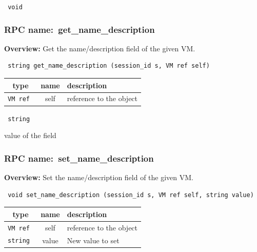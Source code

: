 \vspace{0.3cm}

{\tt 
void
}



\vspace{0.3cm}
\vspace{0.3cm}
\vspace{0.3cm}
\subsubsection{RPC name:~get\_name\_description}

{\bf Overview:} 
Get the name/description field of the given VM.

\begin{verbatim} string get_name_description (session_id s, VM ref self)\end{verbatim}



 
\vspace{0.3cm}
\begin{tabular}{|c|c|p{7cm}|}
 \hline
{\bf type} & {\bf name} & {\bf description} \\ \hline
{\tt VM ref } & self & reference to the object \\ \hline 

\end{tabular}

\vspace{0.3cm}

{\tt 
string
}


value of the field
\vspace{0.3cm}
\vspace{0.3cm}
\vspace{0.3cm}
\subsubsection{RPC name:~set\_name\_description}

{\bf Overview:} 
Set the name/description field of the given VM.

\begin{verbatim} void set_name_description (session_id s, VM ref self, string value)\end{verbatim}



 
\vspace{0.3cm}
\begin{tabular}{|c|c|p{7cm}|}
 \hline
{\bf type} & {\bf name} & {\bf description} \\ \hline
{\tt VM ref } & self & reference to the object \\ \hline 

{\tt string } & value & New value to set \\ \hline 

\end{tabular}

